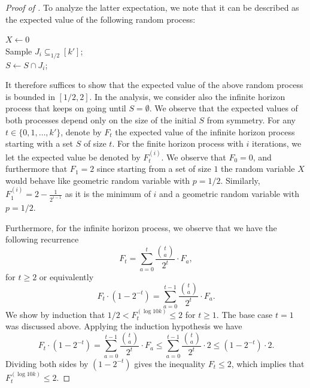 \documentclass[10pt,a4paper]{article}
\theoremstyle{plain}
\theoremstyle{remark}
\theoremstyle{plain}
\begin{document}
\begin{proof}[Proof of ]
To analyze the latter expectation, we note that it can be described as the expected value of the following random process:\\
\begin{algorithm}[H]
\DontPrintSemicolon
$X \leftarrow 0$\\
   {
     Sample $J_i \subseteq_{1/2} [{k'}]$; \\
     $S \leftarrow S \cap J_i$; \\
	}
\end{algorithm}

It therefore suffices to show that the expected value of the above random process is bounded in $[1/2, 2]$.
In the analysis, we consider also the infinite horizon process that keeps on going until $S= \emptyset$.
We observe that the expected values of both processes depend only on the size of the initial $S$ from symmetry.
For any $t \in \{0,1, \ldots, {k'}\}$, denote by $F_{t}$ the expected value of the infinite horizon process starting with a set $S$ of size $t$.
For the finite horizon process with $i$ iterations, we let the expected value be denoted by $F_t^{(i)}$.
We observe that $F_0 = 0$, and furthermore that $F_1 = 2$ since starting from a set of size $1$ the random variable $X$ would behave like geometric random variable with $p=1/2$.
Similarly, 
$F_1^{(i)} = 2 - \frac{1}{2^{i - 1}}$  as it is the minimum of $i$ and a geometric random variable with $p=1/2$.

Furthermore, for the infinite horizon process, we observe that we have the following recurrence $$F_t = \sum_{a=0}^{t} \frac{\binom{t}{a}}{2^{t}} \cdot F_{a},$$
for $t\ge 2$ or equivalently
$$F_t\cdot (1-2^{-t}) = \sum_{a=0}^{t-1} \frac{\binom{t}{a}}{2^{t}} \cdot F_{a}.$$
We show by induction that $1/2< F_t^{(\log 10k)} \le 2$ for $t\ge 1$.
The base case $t=1$ was discussed above.
%
%
%
Applying the induction hypothesis we have 
$$
F_t\cdot (1-2^{-t}) = \sum_{a=0}^{t-1} \frac{\binom{t}{a}}{2^{t}} \cdot F_{a}
\le \sum_{a=0}^{t-1} \frac{\binom{t}{a}}{2^{t}} \cdot 2
\le (1-2^{-t}) \cdot 2.$$
Dividing both sides by $(1-2^{-t})$ gives the  inequality $F_t \le 2$, which implies that $F_t^{(\log 10k)}\leq 2$.


\end{proof}
\end{document}
